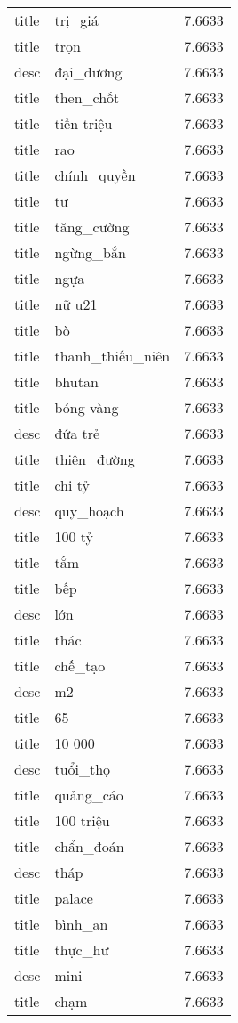 \documentclass{article}
\begin{document}
\begin{tabular}{lll}
title & trị\_giá & 7.6633\\
title & trọn & 7.6633\\
desc & đại\_dương & 7.6633\\
title & then\_chốt & 7.6633\\
title & tiền triệu & 7.6633\\
title & rao & 7.6633\\
title & chính\_quyền & 7.6633\\
title & tư & 7.6633\\
title & tăng\_cường & 7.6633\\
title & ngừng\_bắn & 7.6633\\
title & ngựa & 7.6633\\
title & nữ u21 & 7.6633\\
title & bò & 7.6633\\
title & thanh\_thiếu\_niên & 7.6633\\
title & bhutan & 7.6633\\
title & bóng vàng & 7.6633\\
desc & đứa trẻ & 7.6633\\
title & thiên\_đường & 7.6633\\
title & chi tỷ & 7.6633\\
desc & quy\_hoạch & 7.6633\\
title & 100 tỷ & 7.6633\\
title & tắm & 7.6633\\
title & bếp & 7.6633\\
desc & lớn & 7.6633\\
title & thác & 7.6633\\
title & chế\_tạo & 7.6633\\
desc & m2 & 7.6633\\
title & 65 & 7.6633\\
title & 10 000 & 7.6633\\
desc & tuổi\_thọ & 7.6633\\
title & quảng\_cáo & 7.6633\\
title & 100 triệu & 7.6633\\
title & chẩn\_đoán & 7.6633\\
desc & tháp & 7.6633\\
title & palace & 7.6633\\
title & bình\_an & 7.6633\\
title & thực\_hư & 7.6633\\
desc & mini & 7.6633\\
title & chạm & 7.6633\\

\end{tabular}
\end{document}

